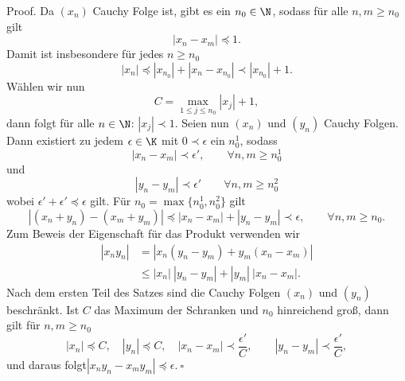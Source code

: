 \documentclass[letterpaper,10pt,english]{jupyterBook}
\begin{document}
\begin{emphBox}{}{}
Proof.  Da \((x_n)\) Cauchy Folge ist, gibt es ein \(n_0 \in \N\), sodass für alle \(n,m \geq n_0\) gilt
\begin{equation*}
 | x_n - x_m | \preceq 1.
\end{equation*}
Damit ist insbesondere für jedes \(n \geq n_0\)
\begin{equation*}
|x_n| \preceq |x_{n_0}| + |x_n - x_{n_0}| \prec |x_{n_0}| +1.
\end{equation*}
Wählen wir nun
\begin{equation*}
C = \max_{1 \leq j \leq n_0} |x_j| + 1,
\end{equation*}
dann folgt für alle \(n \in \N\): \(|x_j| \prec 1\).
Seien nun \((x_n)\) und \((y_n)\) Cauchy Folgen. Dann existiert zu jedem \(\epsilon \in \K\) mit \(0 \prec \epsilon\) ein \(n_0^1\), sodass
\begin{equation*}
|x_n - x_m| \prec \epsilon', \qquad \forall n,m \geq n_0^1
\end{equation*}
und
\begin{equation*}
|y_n - y_m| \prec \epsilon' \qquad \forall n,m \geq n_0^2
\end{equation*}
wobei \(\epsilon'+\epsilon' \preceq \epsilon\)
gilt. Für \(n_0 = \max\{n_0^1,n_0^2\}\) gilt
\begin{equation*}
|(x_n+y_n) - (x_m+y_m)| \preceq |x_n - x_m| + |y_n - y_m| \prec {\epsilon} , \qquad \forall n,m \geq n_0.
\end{equation*}
Zum Beweis der Eigenschaft für das Produkt verwenden wir
\begin{align*}
|x_n y_n| &= | x_n(y_n -y_m) + y_m (x_n - x_m) | \\&\leq |x_n| ~|y_n - y_m| + |y_m|~|x_n - x_m|.\end{align*}
Nach dem ersten Teil des Satzes sind die Cauchy Folgen \((x_n)\) und \((y_n)\) beschränkt. Ist \(C\) das Maximum der Schranken und \(n_0\) hinreichend groß, dann gilt für \(n,m \geq n_0\)
\begin{equation*}
|x_n| \preceq C, \quad |y_n| \preceq C, \quad |x_n - x_m| \prec \frac{\epsilon'}{C}, \qquad|y_n - y_m| \prec \frac{\epsilon'}{C},
\end{equation*}
und daraus folgt\( |x_n y_n - x_m y_m | \preceq \epsilon.~\square \)
\end{emphBox}
\end{document}
